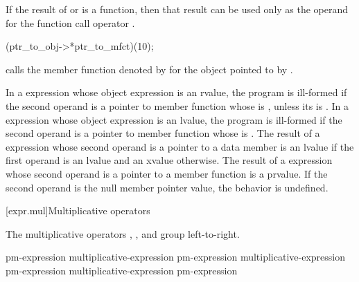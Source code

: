 \pnum
{}%
If the result of  or \tcode{->*} is a function, then that
result can be used only as the operand for the function call operator
\tcode{()}.
\begin{example}
\begin{codeblock}
(ptr_to_obj->*ptr_to_mfct)(10);
\end{codeblock}
calls the member function denoted by  for the object
pointed to by .
\end{example}
In a  expression whose object expression is an rvalue, the program is
ill-formed if the second operand is a pointer to member function
whose  is \tcode{\&},
unless its  is .
In a 
expression whose object expression is an lvalue, the program is ill-formed if the second
operand is
a pointer to member function
whose  is \tcode{\&\&}.
The result of a  expression
whose second operand is a pointer to a data member is an lvalue if the first
operand is an lvalue and an xvalue otherwise. The result of a  expression whose
second operand is a pointer to a member function is a prvalue.
If the second operand is the null
member pointer value, the behavior is undefined.
%
%
%
%
%

[expr.mul]{Multiplicative operators}%
%

\pnum
The multiplicative operators \tcode{*}, \tcode{/}, and \tcode{\%} group
left-to-right.

%
%
%
%
%
%
%
%
\begin{bnf}
\br
    pm-expression\br
    multiplicative-expression \terminal{*} pm-expression\br
    multiplicative-expression \terminal{/} pm-expression\br
    multiplicative-expression \terminal{\%} pm-expression
\end{bnf}

